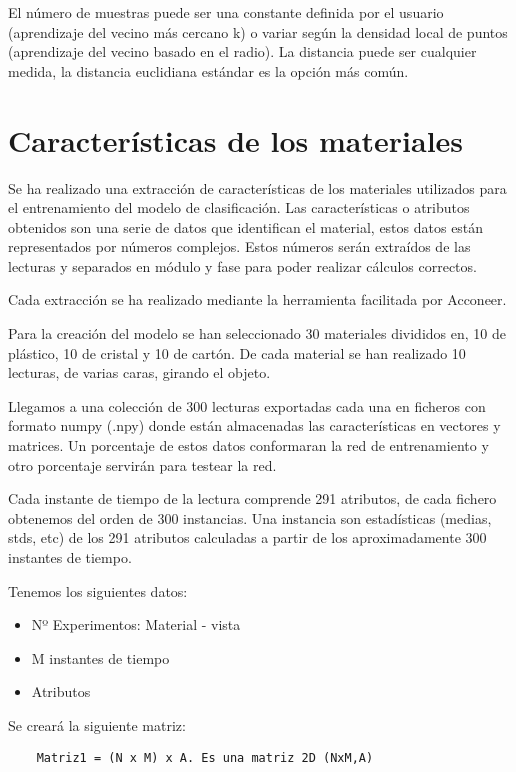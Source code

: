El número de muestras puede ser una constante definida por el usuario (aprendizaje del vecino más cercano k) o variar según la densidad local de puntos (aprendizaje del vecino basado en el radio). La distancia puede ser cualquier medida, la distancia euclidiana estándar es la opción más común.

\section{Características de los materiales}

Se ha realizado una extracción de características de los materiales utilizados para el entrenamiento del modelo de clasificación. Las características o atributos obtenidos son una serie de datos que identifican el material, estos datos están representados por números complejos. Estos números serán extraídos de las lecturas y separados en módulo y fase para poder realizar cálculos correctos.

Cada extracción se ha realizado mediante la herramienta facilitada por Acconeer.


Para la creación del modelo se han seleccionado 30 materiales divididos en, 10 de plástico, 10 de cristal y 10 de cartón. De cada material se han realizado 10 lecturas, de varias caras, girando el objeto.

Llegamos a una colección de 300 lecturas exportadas cada una en ficheros con formato numpy (.npy) donde están almacenadas las características en vectores y matrices. Un porcentaje de estos datos conformaran la red de entrenamiento y otro porcentaje servirán para testear la red.

Cada instante de tiempo de la lectura comprende 291 atributos, de cada fichero obtenemos del orden de 300 instancias.
Una instancia son estadísticas (medias, stds, etc) de los 291 atributos calculadas a partir de los aproximadamente 300 instantes de tiempo.

Tenemos los siguientes datos:
\begin{itemize}
\item Nº Experimentos: Material - vista
\item M instantes de tiempo
\item Atributos
\end{itemize}

Se creará la siguiente matriz:
\begin{verbatim}
	Matriz1 = (N x M) x A. Es una matriz 2D (NxM,A)
\end{verbatim}

